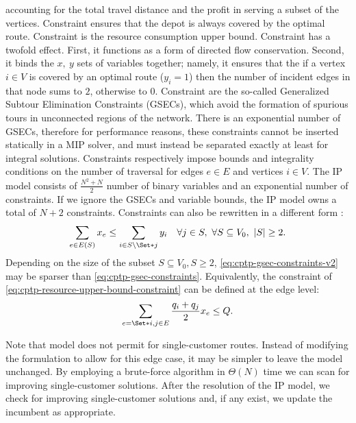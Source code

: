 accounting for the total travel distance and the profit in serving a subset of the vertices.
Constraint  ensures that the depot is always covered by the optimal route.
Constraint  is the resource consumption upper bound.
Constraint  has a twofold effect.
First, it functions as a form of directed flow conservation.
Second, it binds the $x,\ y$ sets of variables together;
namely, it ensures that the if a vertex $i \in V$ is covered by an optimal route ($y_i = 1$)
then the number of incident edges in that node sums to $2$, otherwise to $0$.
Constraint 
are the so-called Generalized Subtour Elimination Constraints (GSECs),
which avoid the formation of spurious tours in unconnected regions of the network.
There is an exponential number of GSECs,
therefore for performance reasons,
these constraints cannot be inserted statically in a MIP solver,
and must instead be separated exactly at least for integral solutions.
Constraints  respectively
impose bounds and integrality conditions
on the number of traversal for edges $e \in E$ and vertices $i \in V$.
The IP model consists of $\frac{N^2 + N}{2}$ number of binary variables and an exponential number of constraints.
If we ignore the GSECs and variable bounds, the IP model owns a total of $N + 2$ constraints.
Constraints 
can also be rewritten in a different form \parencite{wolsey2020integer}:
\begin{equation}
	\label{eq:cptp-gsec-constraints-v2}
	\sum\limits_{e \in E(S)} x_e \le \sum\limits_{i \in S \setminus \Set*{j}} y_i \quad \forall j \in S,\ \forall S \subseteq V_0,\ |S| \ge 2.
\end{equation}
Depending on the size of the subset $S \subseteq V_0, S \ge 2$,
\cref{eq:cptp-gsec-constraints-v2} may be sparser than \cref{eq:cptp-gsec-constraints}.
Equivalently, the constraint of \cref{eq:cptp-resource-upper-bound-constraint}
can be defined at the edge level:
\begin{equation}
	\label{eq:cptp-resource-upper-bound-constraint-edge-level}
	\sum_{e = \Set*{i, j} \in E} \frac{q_i + q_j}{2} x_e \le Q.
\end{equation}

Note that model
does not permit for single-customer routes.
Instead of modifying the formulation to allow for this edge case,
it may be simpler to leave the model unchanged.
By employing a brute-force algorithm in $\Theta(N)$ time we can scan for improving single-customer solutions.
After the resolution of the IP model,
we check for improving single-customer solutions and,
if any exist,
we update the incumbent as appropriate.

